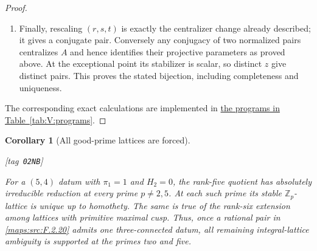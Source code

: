 \documentclass[11pt,a4paper]{article}
\numberwithin{equation}{section}
\newtheorem{corollary}[corollary]{Corollary}
\theoremstyle{definition}
\newcommand{\StatementRecord}[4]{{\upshape\footnotesize[tag~\texttt{#3}]}\enspace\ignorespaces}
\begin{document}
\begin{proof}
\begin{enumerate}[label=\arabic*.]
\item Finally, rescaling $(r,s,t)$ is exactly the centralizer
change already described; it gives a conjugate pair.
Conversely any conjugacy of two normalized pairs centralizes
$A$ and hence identifies their projective parameters as proved
above.  At the exceptional point its stabilizer is scalar,
so distinct $z$ give distinct pairs.  This proves the stated
bijection, including completeness and uniqueness.

\end{enumerate}
The corresponding exact calculations are implemented in \hyperlink{prog:V:normal-forms}{the programs in Table~\ref*{tab:V:programs}}.
\end{proof}




\begin{corollary}[All good-prime lattices are forced]\hypertarget{tag-02NB}{}\label{maps:src:F.2.21}
\StatementRecord{maps:src:F.2.21}{proved}{02NB}{\cref{maps:src:F.2.20}, \cref{maps:src:F.2.19}}


For a $(5,4)$ datum with $\pi_1=1$ and $H_2=0$, the
rank-five quotient has absolutely irreducible reduction
at every prime $p\ne2,5$.  At each such prime its stable
$\mathbb Z_p$-lattice is unique up to homothety.
The same is true of the rank-six extension among lattices
with primitive maximal cusp.  Thus, once a rational pair
in \ref{maps:src:F.2.20} admits one three-connected datum, all remaining integral-lattice
ambiguity is supported at the primes two and five.


\end{corollary}
\end{document}
